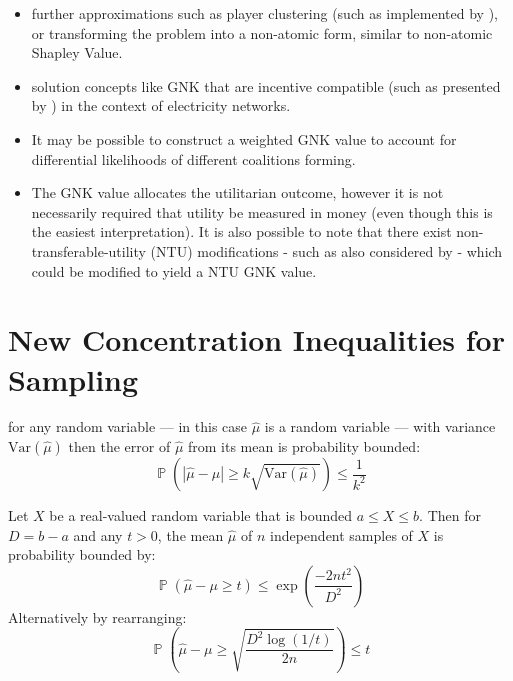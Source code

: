 \documentclass[
10pt, %
a4paper, %
oneside, %
headinclude,footinclude, %
BCOR5mm, %
]{scrartcl}
\DeclareMathOperator{\p}{\mathbb{P}}
\begin{document}
\begin{itemize}
\item	further approximations such as player clustering (such as implemented by \cite{DBLP:journals/corr/abs-1903-10965}), or transforming the problem into a non-atomic form, similar to non-atomic Shapley Value.
\item	solution concepts like GNK that are incentive compatible (such as presented by \cite{myerson1,Salamanca2019}) in the context of electricity networks.
\item	It may be possible to construct a weighted GNK value to account for differential likelihoods of different coalitions forming.
\item	The GNK value allocates the utilitarian outcome, however it is not necessarily required that utility be measured in money (even though this is the easiest interpretation).
It is also possible to note that there exist non-transferable-utility (NTU) modifications - such as also considered by \cite{value1} - which could be modified to yield a NTU GNK value.
\end{itemize}



\section{New Concentration Inequalities for Sampling}

\begin{theorem}\label{thm:chebyshevs}
for any random variable --- in this case $\hat{\mu}$ is a random variable --- with variance $\text{Var}(\hat{\mu})$ then the error of $\hat{\mu}$ from its mean is probability bounded:
$$ \p\left(|\hat{\mu}-\mu|\ge k\sqrt{\text{Var}(\hat{\mu})}\right)\le\frac{1}{k^2} $$
\end{theorem}

\begin{theorem}\label{Hoeffdings_inequality_proper}
Let $X$ be a real-valued random variable that is bounded $a\le X\le b$.  Then for $D=b-a$ and any $t>0$, the mean $\hat{\mu}$ of $n$ independent samples of $X$ is probability bounded by:
\begin{equation}\label{eq_no2}\p(\hat{\mu}-\mu\ge t)\le \exp\left(\frac{-2nt^2}{D^2}\right)
\end{equation}
Alternatively by rearranging:
\begin{equation}\label{eq_no2}\p\left(\hat{\mu}-\mu\ge \sqrt{\frac{D^2\log(1/t)}{2n}}\right)\le t
\end{equation}
\end{theorem}
\end{document}
